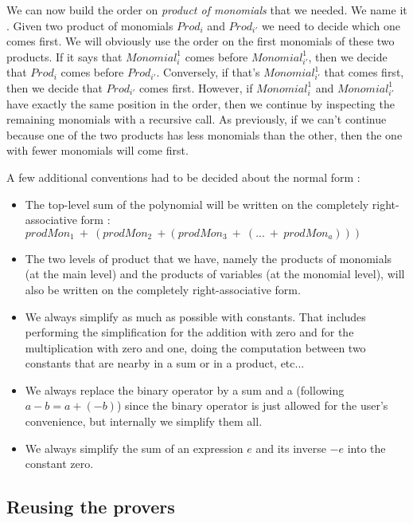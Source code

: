 We can now build the order on \emph{product of monomials} that we needed. We name it . Given two product of monomials $Prod_{i}$ and $Prod_{i'}$ we need to decide which one comes first. We will obviously use the order  on the first monomials of these two products. If it says that $Monomial_{i}^{1}$ comes before $Monomial_{i'}^{1}$, then we decide that $Prod_{i}$ comes before $Prod_{i'}$. Conversely, if that's $Monomial_{i'}^{1}$ that comes first, then we decide that $Prod_{i'}$ comes first. However, if $Monomial_{i}^{1}$ and $Monomial_{i'}^{1}$ have exactly the same position in the order, then we continue by inspecting the remaining monomials with a recursive call. As previously, if we can't continue because one of the two products has less monomials than the other, then the one with fewer monomials will come first.

A few additional conventions had to be decided about the normal form :
\begin{itemize}

\item The top-level sum of the polynomial will be written on the completely right-associative form : \\
$prodMon_1\ +\ (prodMon_2\ + (prodMon_3\ +\ (...\ +\ prodMon_a)))$
\item The two levels of product that we have, namely the products of monomials (at the main level) and the products of variables (at the monomial level), will also be written on the completely right-associative form.
\item We always simplify as much as possible with constants. That includes performing the simplification for the addition with zero and for the multiplication with zero and one, doing the computation between two constants that are nearby in a sum or in a product, etc...
\item We always replace the binary operator  by a sum and a  (following $a-b=a+(-b)$) since the binary operator  is just allowed for the user's convenience, but internally we simplify them all.
\item We always simplify the sum of an expression $e$ and its inverse $-e$ into the constant zero. 

\end{itemize}

\subsection{Reusing the provers}
\label{sect:reusabilityOfTheProvers}

